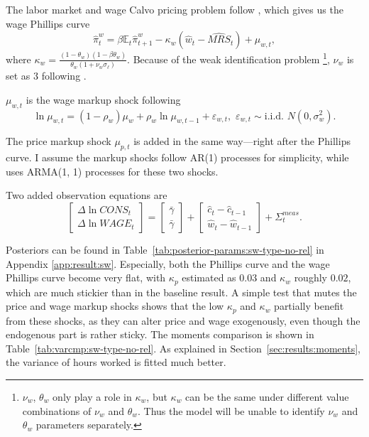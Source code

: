 The labor market and wage Calvo pricing problem follow \cite{erceg2000optimal}, which gives us the wage Phillips curve
\begin{equation}
    \hat{\pi}_t^w = \beta \mathbb{E}_t \hat{\pi}_{t+1}^w - \kappa_w \left(\hat{w}_t - \hat{MRS}_t\right) + \mu_{w, t},
\end{equation}
where $\kappa_w = \frac{(1 - \theta_w)(1 - \beta\theta_w)}{\theta_w(1+\nu_{w} \sigma_\ell)}$. Because of the weak identification problem \footnote{$\nu_w$, $\theta_w$ only play a role in $\kappa_w$, but $\kappa_w$ can be the same under different value combinations of $\nu_w$ and $\theta_w$. Thus the model will be unable to identify $\nu_w$ and $\theta_w$ parameters separately.}, $\nu_w$ is set as $3$ following \cite{smetsShocksFrictionsUS2007}.

$\mu_{w, t}$ is the wage markup shock following
\begin{equation}
    \ln \mu_{w, t} = (1 - \rho_w) \mu_w + \rho_w \ln \mu_{w, t-1} + \varepsilon_{w, t}, \,\, \varepsilon_{w, t}\sim \text{i.i.d. } N (0, \sigma_w^2).
\end{equation}

The price markup shock $\mu_{p, t}$ is added in the same way---right after the Phillips curve. I assume the markup shocks follow AR(1) processes for simplicity, while \cite{smetsShocksFrictionsUS2007} uses ARMA(1, 1) processes for these two shocks.

Two added observation equations are
\begin{equation}
    \begin{bmatrix}
        \Delta \ln CONS_t\\
        \Delta \ln WAGE_t
    \end{bmatrix}
    = 
    \begin{bmatrix}
        \bar{\gamma}\\
        \bar{\gamma}
    \end{bmatrix}
    +
    \begin{bmatrix}
        \hat{c}_t - \hat{c}_{t-1} \\
        \hat{w}_t - \hat{w}_{t-1}
    \end{bmatrix}
    +
    \Sigma_t^{meas}.
\end{equation}

Posteriors can be found in Table~\ref{tab:posterior-params:sw-type-no-rel} in Appendix \ref{app:result:sw}. Especially, both the Phillips curve and the wage Phillips curve become very flat, with $\kappa_p$ estimated as $0.03$ and $\kappa_w$ roughly $0.02$, which are much stickier than in the baseline result. A simple test that mutes the price and wage markup shocks shows that the low $\kappa_p$ and $\kappa_w$ partially benefit from these shocks, as they can alter price and wage exogenously, even though the endogenous part is rather sticky. The moments comparison is shown in Table~\ref{tab:varcmp:sw-type-no-rel}. As explained in Section~\ref{sec:results:moments}, the variance of hours worked is fitted much better.

